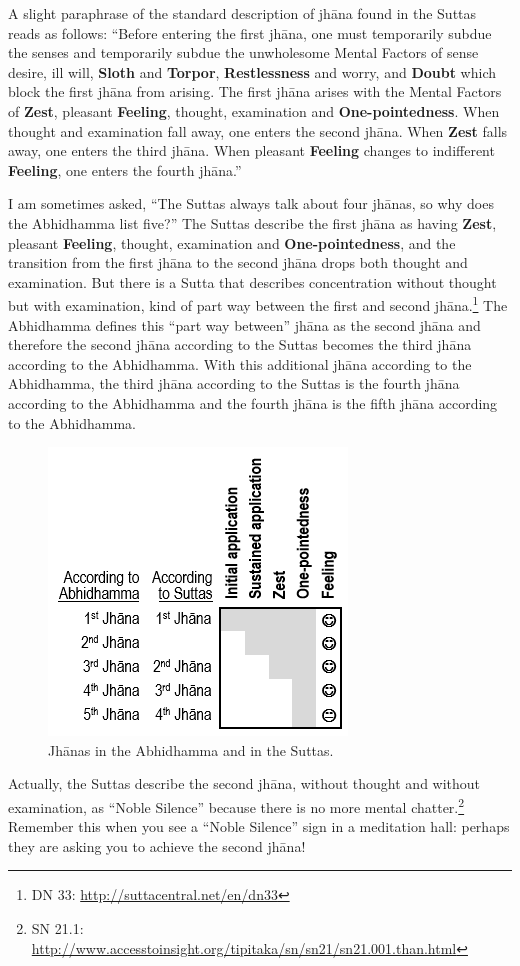 A slight paraphrase of the standard description of jhāna found in the Suttas reads as follows: “Before entering the first jhāna, one must temporarily subdue the senses and temporarily subdue the unwholesome Mental Factors of sense desire, ill will, \textbf{Sloth} and \textbf{Torpor}, \textbf{Restlessness} and worry, and \textbf{Doubt} which block the first jhāna from arising. The first jhāna arises with the Mental Factors of \textbf{Zest}, pleasant \textbf{Feeling}, thought, examination and \textbf{One-pointedness}. When thought and examination fall away, one enters the second jhāna. When \textbf{Zest} falls away, one enters the third jhāna. When pleasant \textbf{Feeling} changes to indifferent \textbf{Feeling}, one enters the fourth jhāna.”

I am sometimes asked, “The Suttas always talk about four jhānas, so why does the Abhidhamma list five?” The Suttas describe the first jhāna as having \textbf{Zest}, pleasant \textbf{Feeling}, thought, examination and \textbf{One-pointedness}, and the transition from the first jhāna to the second jhāna drops both thought and examination. But there is a Sutta that describes concentration without thought but with examination, kind of part way between the first and second jhāna.\footnote{DN 33: \url{http://suttacentral.net/en/dn33}} The Abhidhamma defines this “part way between” jhāna as the second jhāna and therefore the second jhāna according to the Suttas becomes the third jhāna according to the Abhidhamma. With this additional jhāna according to the Abhidhamma, the third jhāna according to the Suttas is the fourth jhāna according to the Abhidhamma and the fourth jhāna is the fifth jhāna according to the Abhidhamma.

\begin{figure}[h]
\centering
\includegraphics[width=0.4\linewidth]{./Diagrams/Jhana}
\caption{Jhānas in the Abhidhamma and in the Suttas.}
\label{fig:Jhana}
\end{figure}

Actually, the Suttas describe the second jhāna, without thought and without examination, as “Noble Silence” because there is no more mental chatter.\footnote{SN 21.1: \url{http://www.accesstoinsight.org/tipitaka/sn/sn21/sn21.001.than.html}} Remember this when you see a “Noble Silence” sign in a meditation hall: perhaps they are asking you to achieve the second jhāna!

